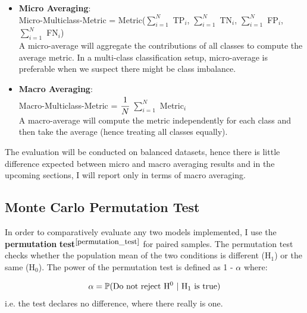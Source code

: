 \begin{itemize}
  \item \textbf{Micro Averaging}: \\
        Micro-Multiclass-Metric = Metric($\sum_{i=1}^{N}$ TP$_i$, $\sum_{i=1}^{N}$ TN$_i$, $\sum_{i=1}^{N}$ FP$_i$, $\sum_{i=1}^{N}$ FN$_i$) \\
        A micro-average will aggregate the contributions of all classes to compute the average metric. In a multi-class classification setup, micro-average is preferable when we suspect there might be class imbalance.

  \item \textbf{Macro Averaging}: \\
        Macro-Multiclass-Metric = $\cfrac{1}{N}$ $\sum_{i=1}^{N}$ Metric$_i$ \\
        A macro-average will compute the metric independently for each class and then take the average (hence treating all classes equally).
\end{itemize}

The evaluation will be conducted on balanced datasets, hence there is little difference expected between micro and macro averaging results and in the upcoming sections, I will report only in terms of macro averaging. \\


\subsection{Monte Carlo Permutation Test}

In order to comparatively evaluate any two models implemented, I use the \textbf{permutation} \textbf{test}$^{\small \cite{permutation_test}}$ for paired samples. The permutation test checks whether the population mean of the two conditions is different (H$_1$) or the same (H$_0$). The power of the permutation test is defined as 1 - $\alpha$ where:

\begin{equation}
  \centering
  \alpha = \mathbb{P}(\text{Do not reject H$^0$ | H$_1$ is true}) \newline
\end{equation}
i.e. the test declares no difference, where there really is one. \\

